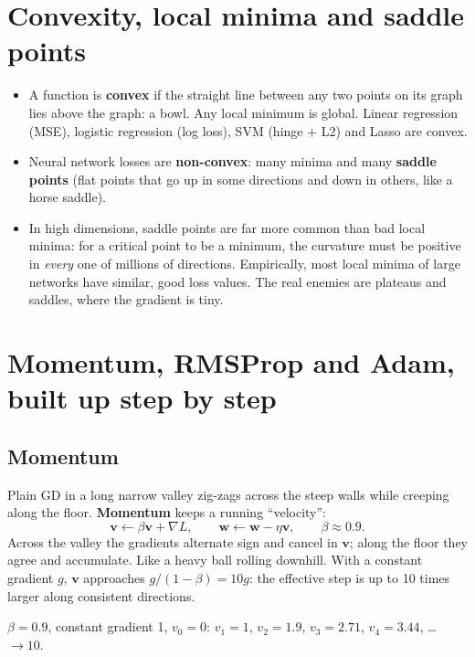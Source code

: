 \section{Convexity, local minima and saddle points}
\begin{itemize}
\item A function is \textbf{convex} if the straight line between any two points on its graph lies above the graph: a
  bowl. Any local minimum is global. Linear regression (MSE), logistic regression (log loss), SVM (hinge + L2) and Lasso
  are convex.
\item Neural network losses are \textbf{non-convex}: many minima and many \textbf{saddle points} (flat points that go up in
  some directions and down in others, like a horse saddle).
\item In high dimensions, saddle points are far more common than bad local minima: for a critical point to be a minimum,
  the curvature must be positive in \emph{every} one of millions of directions. Empirically, most local minima of large
  networks have similar, good loss values. The real enemies are plateaus and saddles, where the gradient is tiny.
\end{itemize}

\section{Momentum, RMSProp and Adam, built up step by step}

\subsection{Momentum}
Plain GD in a long narrow valley zig-zags across the steep walls while creeping along the floor. \textbf{Momentum} keeps a
running ``velocity'':
\[ \mathbf v \leftarrow \beta\mathbf v + \nabla L,\qquad \mathbf w \leftarrow \mathbf w - \eta\mathbf v,\qquad \beta\approx0.9. \]
Across the valley the gradients alternate sign and cancel in $\mathbf v$; along the floor they agree and accumulate. Like a
heavy ball rolling downhill. With a constant gradient $g$, $\mathbf v$ approaches $g/(1-\beta) = 10g$: the effective step is
up to 10 times larger along consistent directions.

\begin{example}
$\beta = 0.9$, constant gradient 1, $v_0 = 0$: $v_1 = 1$, $v_2 = 1.9$, $v_3 = 2.71$, $v_4 = 3.44$, \dots\ $\to 10$.
\end{example}

